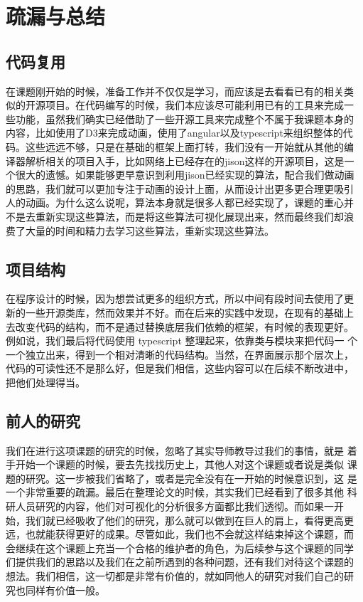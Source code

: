 \section{疏漏与总结}
\subsection{代码复用}
在课题刚开始的时候，准备工作并不仅仅是学习，而应该是去看看已有的相关类
似的开源项目。在代码编写的时候，我们本应该尽可能利用已有的工具来完成一
些功能，虽然我们确实已经借助了一些开源工具来完成整个不属于我课题本身的
内容，比如使用了D3来完成动画，使用了angular以及typescript来组织整体的代
码。这些远远不够，只是在基础的框架上面打转，我们没有一开始就从其他的编
译器解析相关的项目入手，比如网络上已经存在的jison这样的开源项目，这是一
个很大的遗憾。如果能够更早意识到利用jison已经实现的算法，配合我们做动画
的思路，我们就可以更加专注于动画的设计上面，从而设计出更多更合理更吸引
人的动画。为什么这么说呢，算法本身就是很多人都已经实现了，课题的重心并
不是去重新实现这些算法，而是将这些算法可视化展现出来，然而最终我们却浪
费了大量的时间和精力去学习这些算法，重新实现这些算法。
\subsection{项目结构}
在程序设计的时候，因为想尝试更多的组织方式，所以中间有段时间去使用了更
新的一些开源类库，然而效果并不好。而在后来的实践中发现，在现有的基础上
去改变代码的结构，而不是通过替换底层我们依赖的框架，有时候的表现更好。
例如说，我们最后将代码使用 typescript 整理起来，依靠类与模块来把代码一
个一个独立出来，得到一个相对清晰的代码结构。当然，在界面展示那个层次上，
代码的可读性还不是那么好，但是我们相信，这些内容可以在后续不断改进中，
把他们处理得当。
\subsection{前人的研究}
我们在进行这项课题的研究的时候，忽略了其实导师教导过我们的事情，就是
着手开始一个课题的时候，要去先找找历史上，其他人对这个课题或者说是类似
课题的研究。这一步被我们省略了，或者是完全没有在一开始的时候意识到，这
是一个非常重要的疏漏。最后在整理论文的时候，其实我们已经看到了很多其他
科研人员研究的内容，他们对可视化的分析很多方面都比我们透彻。而如果一开
始，我们就已经吸收了他们的研究，那么就可以做到在巨人的肩上，看得更高更
远，也就能获得更好的成果。尽管如此，我们也不会就这样结束掉这个课题，而
会继续在这个课题上充当一个合格的维护者的角色，为后续参与这个课题的同学
们提供我们的思路以及我们在之前所遇到的各种问题，还有我们对待这个课题的
想法。我们相信，这一切都是非常有价值的，就如同他人的研究对我们自己的研
究也同样有价值一般。
